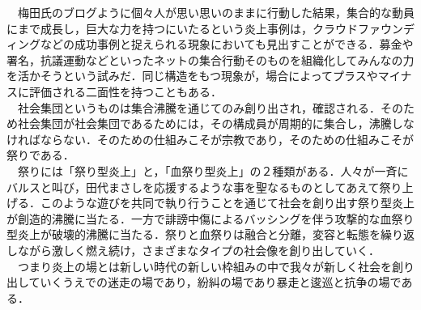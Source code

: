 \documentclass[uplatex,twocolumn,dvipdfmx]{jsarticle}
\begin{document}
　梅田氏のブログように個々人が思い思いのままに行動した結果，集合的な動員にまで成長し，巨大な力を持つにいたるという炎上事例は，クラウドファウンディングなどの成功事例と捉えられる現象においても見出すことができる．募金や署名，抗議運動などといったネットの集合行動そのものを組織化してみんなの力を活かそうという試みだ．同じ構造をもつ現象が，場合によってプラスやマイナスに評価される二面性を持つこともある．\\
　社会集団というものは集合沸騰を通じてのみ創り出され，確認される．そのため社会集団が社会集団であるためには，その構成員が周期的に集合し，沸騰しなければならない．そのための仕組みこそが宗教であり，そのための仕組みこそが祭りである．\\
　祭りには「祭り型炎上」と，「血祭り型炎上」の２種類がある．人々が一斉にバルスと叫び，田代まさしを応援するような事を聖なるものとしてあえて祭り上げる．このような遊びを共同で執り行うことを通じて社会を創り出す祭り型炎上が創造的沸騰に当たる．一方で誹謗中傷によるバッシングを伴う攻撃的な血祭り型炎上が破壊的沸騰に当たる．祭りと血祭りは融合と分離，変容と転態を繰り返しながら激しく燃え続け，さまざまなタイプの社会像を創り出していく．\\
　つまり炎上の場とは新しい時代の新しい枠組みの中で我々が新しく社会を創り出していくうえでの迷走の場であり，紛糾の場であり暴走と逡巡と抗争の場である．



\end{document}
